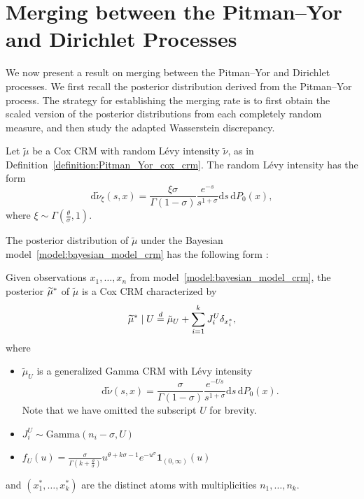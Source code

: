 
\section{Merging between the Pitman--Yor and Dirichlet Processes}\label{section:py_dp_merging}

We now present a result on merging between the Pitman--Yor and Dirichlet processes. We first recall the posterior distribution derived from the Pitman--Yor process. The strategy for establishing the merging rate is to first obtain the scaled version of the posterior distributions from each completely random measure, and then study the adapted Wasserstein discrepancy.

Let $\tilde{\mu}$ be a Cox CRM with random L\'evy intensity $\tilde{\nu}$, as in Definition~\ref{definition:Pitman_Yor_cox_crm}. The random L\'evy intensity has the form
\[
\mathrm{d}\tilde{\nu}_\xi(s,x) = \frac{\xi \sigma}{\Gamma(1-\sigma)}\frac{e^{-s}}{s^{1+\sigma}}\mathrm{d}s\,\mathrm{d}P_0(x),
\]
where $\xi \sim \Gamma\left(\frac{\theta}{\sigma}, 1 \right)$.

The posterior distribution of $\tilde{\mu}$ under the Bayesian model~\ref{model:bayesian_model_crm} has the following form \cite[p.~114]{hjort2010bayesian}:

Given observations $x_1,\dots, x_n$ from model~\ref{model:bayesian_model_crm}, the posterior $\widetilde{\mu}^*$ of $\tilde{\mu}$ is a Cox CRM characterized by
\[
\widetilde{\mu}^* \mid U \overset{d}{=} \tilde{\mu}_U + \sum_{i = 1}^k J_i^U \delta_{x_i^*},
\]
where
\begin{itemize}
    \item $\tilde{\mu}_U$ is a generalized Gamma CRM with L\'evy intensity
    \[
    \mathrm{d}\tilde{\nu}(s,x) = \frac{\sigma}{\Gamma(1 - \sigma)} \frac{e^{-Us}}{s^{1+\sigma}} \mathrm{d}s\,\mathrm{d}P_0(x).
    \]
    Note that we have omitted the subscript $U$ for brevity.
    \item $J_i^U \sim \mathrm{Gamma}(n_i - \sigma, U)$
    \item $f_U(u) = \frac{\sigma}{\Gamma\left(k+\frac{\theta}{\sigma}\right)} u^{\theta + k\sigma - 1}e^{-u^\sigma}\mathbf{1}_{(0,\infty)}(u)$
\end{itemize}
and $(x_1^*,\dots, x_k^*)$ are the distinct atoms with multiplicities $n_1,\dots, n_k$.

